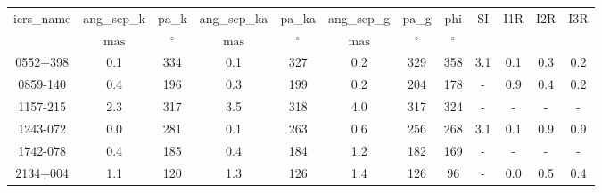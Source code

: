 \begin{table}
\begin{tabular}{cccccccccccc}
iers_name & ang_sep_k & pa_k & ang_sep_ka & pa_ka & ang_sep_g & pa_g & phi & SI & I1R & I2R & I3R \\
 & $\mathrm{mas}$ & $\mathrm{{}^{\circ}}$ & $\mathrm{mas}$ & $\mathrm{{}^{\circ}}$ & $\mathrm{mas}$ & $\mathrm{{}^{\circ}}$ & $\mathrm{{}^{\circ}}$ &  &  &  &  \\
0552+398 & 0.1 & 334 & 0.1 & 327 & 0.2 & 329 & 358 & 3.1 & 0.1 & 0.3 & 0.2 \\
0859-140 & 0.4 & 196 & 0.3 & 199 & 0.2 & 204 & 178 & - & 0.9 & 0.4 & 0.2 \\
1157-215 & 2.3 & 317 & 3.5 & 318 & 4.0 & 317 & 324 & - & - & - & - \\
1243-072 & 0.0 & 281 & 0.1 & 263 & 0.6 & 256 & 268 & 3.1 & 0.1 & 0.9 & 0.9 \\
1742-078 & 0.4 & 185 & 0.4 & 184 & 1.2 & 182 & 169 & - & - & - & - \\
2134+004 & 1.1 & 120 & 1.3 & 126 & 1.4 & 126 & 96 & - & 0.0 & 0.5 & 0.4 \\
\end{tabular}
\end{table}

